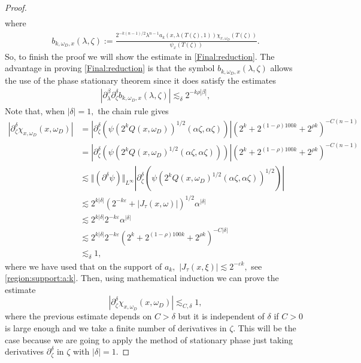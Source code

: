 \documentclass[12pt, reqno]{amsart}
\theoremstyle{definition}
\theoremstyle{remark}
\numberwithin{equation}{section}
\begin{document}
\begin{proof}
\begin{align}
 \end{align}
where
\begin{align*}
b_{k,\omega_D,x}(\lambda,\zeta):=    \frac{2^{-k(n-1)/2} \lambda^{n-1}a_k(x,\lambda(T(\zeta),1)) \chi_{x,\omega_D}(T(\zeta))  }{\psi_{x}(T(\zeta))}  .
\end{align*}So, to finish the proof we will show the estimate in \eqref{Final:reduction}. The advantage in proving \eqref{Final:reduction} is that the symbol $b_{k,\omega_D,x}(\lambda,\zeta)$ allows the use of the phase stationary theorem since it does satisfy the estimates
\begin{align}\label{the:symbol:b}
    |\partial_\lambda^{\beta}\partial_{\zeta}^{\delta}b_{k,\omega_D,x}(\lambda,\zeta)|\lesssim_{\delta} 2^{-k\rho|\beta|},
\end{align}
Note that, when $|\delta|=1,$ the chain rule gives
\begin{align*}
    |\partial_{\zeta}^\delta \chi_{x,\omega_D}(x,\omega_D)|&=|\partial_{\zeta}^\delta\left( \psi(2^{k}Q(x,\omega_D))^{1/2}(\alpha \zeta,\alpha\zeta)\right)|(2^{ k}+2^{(1-\rho)100 k}+2^{\rho k})^{-C(n-1)}\\
    &=|\partial_{\zeta}^\delta\left( \psi(2^{k}Q(x,\omega_D)^{1/2}(\alpha \zeta,\alpha \zeta))\right)|(2^{ k}+2^{(1-\rho)100 k}+2^{\rho k})^{-C(n-1)}\\
    &\lesssim \Vert(\partial^{\delta}\psi)\Vert_{L^\infty}|\partial_{\zeta}^\delta(\psi(2^{k}Q(x,\omega_D)^{1/2}(\alpha \zeta,\alpha \zeta))^{1/2})|\\
    &\lesssim 2^{k|\delta|}(2^{-k\varepsilon}+|J_\tau(x,\omega)|)^{1/2}\alpha^{|\delta|}\\
     &\lesssim 2^{k|\delta|}2^{-k\varepsilon}\alpha^{|\delta|}\\
     &\lesssim 2^{k|\delta|}2^{-k\varepsilon}(2^{ k}+2^{(1-\rho)100 k}+2^{\rho k})^{-C|\delta|}\\
     &\lesssim_\delta 1,
\end{align*} where we have used that on the support of $a_k,$ $|J_{\tau}(x,\xi)|\lesssim 2^{-\varepsilon k}, $ see \eqref{region:support:a:k}. Then, using mathematical induction we can prove the estimate
$$ |\partial_{\zeta}^\delta \chi_{x,\omega_D}(x,\omega_D)|\lesssim_{C,\delta} 1,$$ where the previous estimate depends on $C>\delta$ but it is independent of $\delta$ if $C>0$ is large enough and we take a finite number of derivatives in $\zeta$. This will be the case because we are going to apply the method of stationary phase just taking derivatives $\partial_\zeta^\delta$ in $\zeta$ with $|\delta|=1.$

\end{proof}
\end{document}
